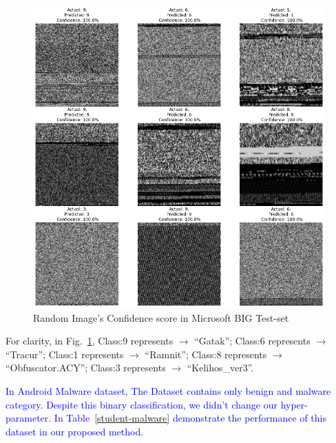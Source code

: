 \documentclass[pdflatex,sn-mathphys]{sn-jnl}%
\begin{document}
\begin{figure}[tb]
    \centering
    \captionsetup{justification=centering}
    \includegraphics[width=1\textwidth]{big.png}
	\caption{ Random Image's Confidence score in Microsoft BIG Test-set}
	\label{fig:def5}
\end{figure}
	
For clarity, in Fig.~\ref{fig:def5}, Class:9 represents $\xrightarrow{}$ ``Gatak''; Class:6 represents $\xrightarrow{}$ ``Tracur''; Class:1 represents $\xrightarrow{}$ ``Ramnit''; Class:8 represents $\xrightarrow{}$ ``Obfuscator.ACY''; Class:3 represents $\xrightarrow{}$ ``Kelihos\_ver3''.
\par
\textcolor{blue}{In Android Malware dataset, The Dataset contains only benign and malware category. Despite this binary classification, we didn't change our hyper-parameter. In Table~\ref{student-malware} demonstrate the performance of this dataset in our proposed method.}
\end{document}
